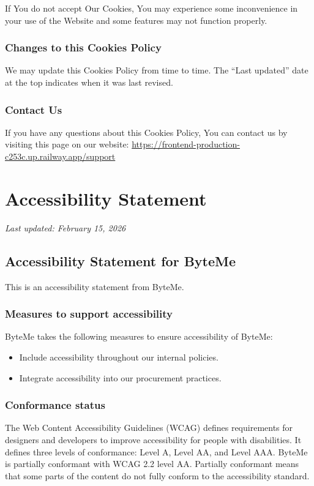 \documentclass[11pt, a4paper]{report}
\begin{document}
If You do not accept Our Cookies, You may experience some inconvenience in your use of the Website and some features may not function properly.

\subsection*{Changes to this Cookies Policy}
We may update this Cookies Policy from time to time. The ``Last updated'' date at the top indicates when it was last revised.

\subsection*{Contact Us}
If you have any questions about this Cookies Policy, You can contact us by visiting this page on our website: \url{https://frontend-production-c253c.up.railway.app/support}

\chapter{Accessibility Statement}
\textit{Last updated: February 15, 2026}
\bigskip

\section*{Accessibility Statement for ByteMe}
This is an accessibility statement from ByteMe.

\subsection*{Measures to support accessibility}
ByteMe takes the following measures to ensure accessibility of ByteMe:

\begin{itemize}
	\item Include accessibility throughout our internal policies.
	\item Integrate accessibility into our procurement practices.
\end{itemize}

\subsection*{Conformance status}
The Web Content Accessibility Guidelines (WCAG) defines requirements for designers and developers to improve accessibility for people with disabilities. It defines three levels of conformance: Level A, Level AA, and Level AAA. ByteMe is partially conformant with WCAG 2.2 level AA. Partially conformant means that some parts of the content do not fully conform to the accessibility standard.
\end{document}
